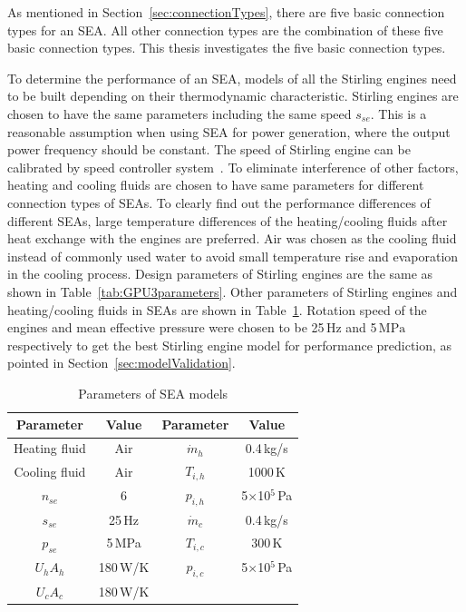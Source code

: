 As mentioned in Section~\ref{sec:connectionTypes}, there are five basic connection types for an SEA. All other connection types are the combination of these five basic connection types. This thesis investigates the five basic connection types.

To determine the performance of an SEA, models of all the Stirling engines need to be built depending on their thermodynamic characteristic. Stirling engines are chosen to have the same parameters including the same speed $s_{se}$. This is a reasonable assumption when using SEA for power generation, where the output power frequency should be constant. The speed of Stirling engine can be calibrated by speed controller system~\cite{Hooshang2016}. To eliminate interference of other factors, heating and cooling fluids are chosen to have same parameters for different connection types of SEAs. To clearly find out the performance differences of different SEAs, large temperature differences of the heating/cooling fluids after heat exchange with the engines are preferred. Air was chosen as the cooling fluid instead of commonly used water to avoid small temperature rise and evaporation in the cooling process. Design parameters of Stirling engines are the same as shown in Table~\ref{tab:GPU3parameters}. Other parameters of Stirling engines and heating/cooling fluids in SEAs are shown in Table~\ref{tab:parameters}. Rotation speed of the engines and mean effective pressure were chosen to be 25$\,\mathrm{Hz}$ and 5$\,\mathrm{MPa}$ respectively to get the best Stirling engine model for performance prediction, as pointed in Section~\ref{sec:modelValidation}.

\begin{table}[htbp]
	\caption{Parameters of SEA models}
	\begin{center}
	\begin{tabular}{cccc}
		\toprule
		Parameter		&	Value	& Parameter	&	Value\\
		\midrule
		Heating fluid	&	Air		&	$\dot{m}_h$	&	0.4\,kg/s\\
		Cooling fluid	&	Air	&	$T_{i,h}$	&	1000\,K\\
		$n_{se}$	&	6	&	$p_{i,h}$	&	5$\times$10$^5$\,Pa\\
		$s_{se}$	&	25\,Hz	&	$\dot{m}_c$	&	0.4\,kg/s\\
		$p_{se}$		&	5\,MPa	&	$T_{i,c}$	&	300\,K\\
		$U_hA_h$	&	180\,W/K	&	$p_{i,c}$	&	5$\times$10$^5$\,Pa\\
		$U_cA_c$		&	180\,W/K	&&\\
		\bottomrule
	\end{tabular}
	\end{center}
	\label{tab:parameters}
\end{table}


